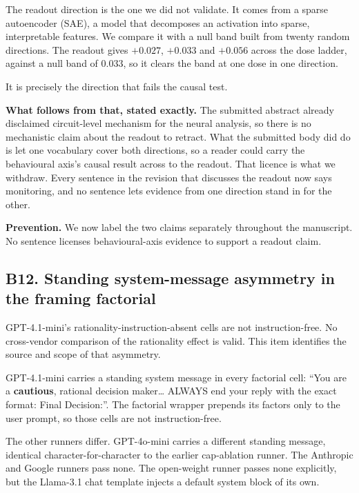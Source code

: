 The readout direction is the one we did not validate. It comes from a sparse autoencoder (SAE), a
model that decomposes an activation into sparse, interpretable features. We compare it with a null
band built from twenty random directions. The readout gives $+0.027$, $+0.033$ and $+0.056$ across
the dose ladder, against a null band of 0.033, so it clears the band at one dose in one direction.

It is precisely the direction that fails the causal test.

\textbf{What follows from that, stated exactly.} The submitted abstract already disclaimed
circuit-level mechanism for the neural analysis, so there is no mechanistic claim about the readout
to retract. What the submitted body did do is let one vocabulary cover both directions, so a reader
could carry the behavioural axis's causal result across to the readout. That licence is what we
withdraw. Every sentence in the revision that discusses the readout now says monitoring, and no
sentence lets evidence from one direction stand in for the other.

\textbf{Prevention.} We now label the two claims separately throughout the manuscript. No sentence
licenses behavioural-axis evidence to support a readout claim.


\subsection*{B12. Standing system-message asymmetry in the framing factorial}

GPT-4.1-mini's rationality-instruction-absent cells are not instruction-free. No cross-vendor
comparison of the rationality effect is valid. This item identifies the source and scope of that
asymmetry.

GPT-4.1-mini carries a standing system message in every factorial cell: ``You are a
\textbf{cautious}, rational decision maker\ldots{} ALWAYS end your reply with the exact format:
Final Decision:''. The factorial wrapper prepends its factors only to the user prompt, so those
cells are not instruction-free.

The other runners differ. GPT-4o-mini carries a different standing message, identical
character-for-character to the earlier cap-ablation runner. The Anthropic and Google runners pass
none. The open-weight runner passes none explicitly, but the Llama-3.1 chat template injects a
default system block of its own.

